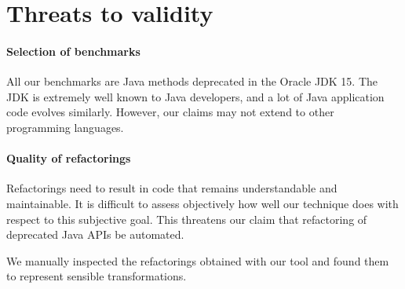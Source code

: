\documentclass[sigconf,review,anonymous]{acmart}
\begin{document}

\section{Threats to validity}

\paragraph{Selection of benchmarks}
%
All our benchmarks are Java methods deprecated in the Oracle JDK 15.
The JDK is extremely well known to Java developers, and a lot
of Java application code evolves similarly.
%
However, our claims may not extend to other programming languages.


\paragraph{Quality of refactorings} Refactorings need to result in code that
remains understandable and maintainable.  It is difficult to assess
objectively how well our technique does with respect to this subjective
goal.  This threatens our claim that refactoring of deprecated Java APIs
be automated.

%
We manually inspected the refactorings obtained with
our tool and found them to represent sensible transformations.
\end{document}
